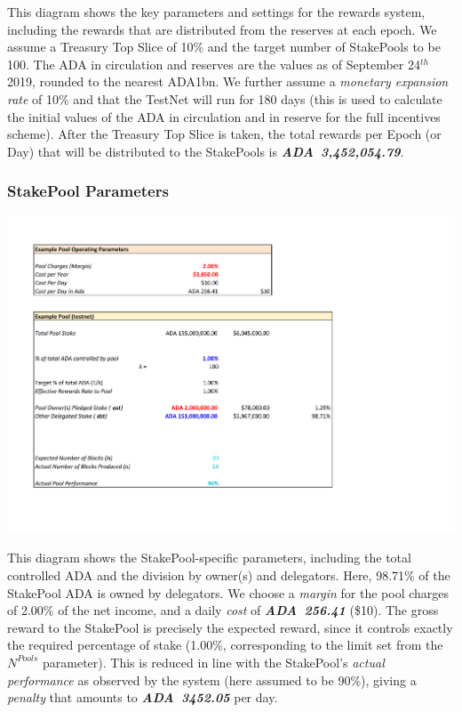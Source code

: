\documentclass[11pt,a4paper,dvipsnames,twosided,final]{article}
\newcommand{\ada}{ADA{}}
\newcommand{\ADA}[1]{\textbf{\emph{\ada~{#1}}}}
\begin{document}
\begin{minipage}{\textwidth}
\noindent
This diagram shows the key parameters and settings for the rewards system, including the
rewards that are distributed from the reserves at each epoch.  We assume a Treasury Top Slice
of 10\% and the target number of StakePools to be 100.  The \ada{} in circulation and reserves
are the values as of September 24$^{th}$ 2019, rounded to the nearest ADA{1bn}.  We further
assume a \emph{monetary expansion rate} of 10\% and that the TestNet will run for 180 days
(this is used to calculate the initial values of the \ada{} in circulation and in reserve
for the full incentives scheme).  After the Treasury Top Slice is taken, the total
rewards per Epoch (or Day) that will be distributed to the StakePools is \ADA{3,452,054.79}.
\end{minipage}

\clearpage
\subsubsection*{StakePool Parameters}
\includegraphics[width=1.2\textwidth]{RCT3.pdf}
\vspace{-0.5in}

\noindent
This diagram shows the StakePool-specific parameters, including the total controlled \ada{} and the
division by owner(s) and delegators.  Here, 98.71\% of the StakePool \ada{} is owned
by delegators.  We choose a \emph{margin} for the pool charges of 2.00\% of the net income,
and a daily \emph{cost} of \ADA{256.41} (\$10).
The gross reward to the StakePool is precisely the expected reward, since it controls
exactly the required percentage of stake (1.00\%, corresponding to the limit set from
the $N^{\textit{Pools}}$ parameter).  This is reduced in line with the StakePool's \emph{actual performance}
as observed by the system (here assumed to be 90\%), giving a \emph{penalty} that amounts
to \ADA{3452.05} per day.
\end{document}
